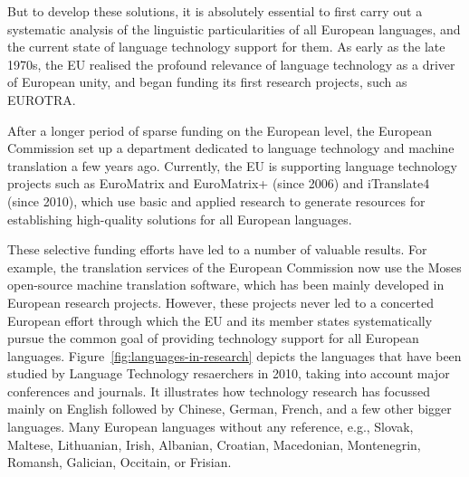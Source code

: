 \begin{multicols}{2}
But to develop these solutions, it is absolutely essential to first carry out a systematic analysis of the linguistic particularities of all European languages, and the current state of language technology support for them. As early as the late 1970s, the EU realised the profound relevance of language technology as a driver of European unity, and began funding its first research projects, such as EUROTRA.

After a longer period of sparse funding on the European level, the European Commission set up a department dedicated to language technology and machine translation a few years ago. Currently, the EU is supporting language technology projects such as EuroMatrix and EuroMatrix+ (since 2006) and iTranslate4 (since 2010), which use basic and applied research to generate resources for establishing high-quality solutions for all European languages.

These selective funding efforts have led to a number of valuable results. For example, the translation services of the European Commission now use the Moses open-source machine translation software, which has been mainly developed in European research projects. However, these projects never led to a concerted European effort through which the EU and its member states systematically pursue the common goal of providing technology support for all European languages. Figure~\ref{fig:languages-in-research} depicts the languages that have been studied by Language Technology resaerchers in 2010, taking into account major conferences and journals. It illustrates how technology research has focussed mainly on English followed by Chinese, German, French, and a few other bigger languages. Many European languages without any reference, e.g., Slovak, Maltese, Lithuanian, Irish, Albanian, Croatian, Macedonian, Montenegrin, Romansh, Galician, Occitain, or Frisian.


\end{multicols}
